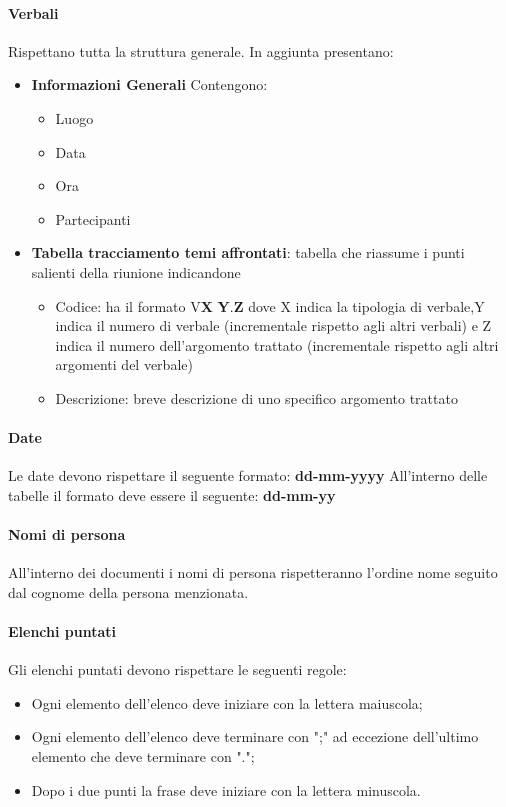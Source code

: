 \paragraph{Verbali}
Rispettano tutta la struttura generale.
In aggiunta presentano:
\begin{itemize} 
    \item \textbf{Informazioni Generali}
    Contengono:
    \begin{itemize} 
        \item Luogo
        \item Data
        \item Ora
        \item Partecipanti
    \end{itemize}
\item \textbf{Tabella tracciamento temi affrontati}:
tabella che riassume i punti salienti della riunione indicandone
    \begin{itemize} 
        \item Codice: ha il formato V\textbf{X} \textbf{Y}.\textbf{Z} dove X indica la tipologia di verbale,Y indica il numero di verbale (incrementale rispetto agli altri verbali) 
        e Z indica il numero dell'argomento trattato (incrementale rispetto agli altri argomenti del verbale) 
        \item Descrizione: breve descrizione di uno specifico argomento trattato
    \end{itemize}

\end{itemize}

\paragraph{Date}
Le date devono rispettare il seguente formato: \textbf{dd-mm-yyyy}
All'interno delle tabelle il formato deve essere il seguente: \textbf{dd-mm-yy}
\paragraph{Nomi di persona}
All'interno dei documenti i nomi di persona rispetteranno l'ordine nome seguito dal cognome della persona menzionata.

\paragraph{Elenchi puntati}
Gli elenchi puntati devono rispettare le seguenti regole:
\begin{itemize} 
    \item Ogni elemento dell'elenco deve iniziare con la lettera maiuscola;
    \item Ogni elemento dell'elenco deve terminare con ";" ad eccezione dell'ultimo elemento
    che deve terminare con "."; 
    \item Dopo i due punti la frase deve iniziare con la lettera minuscola.
\end{itemize}

